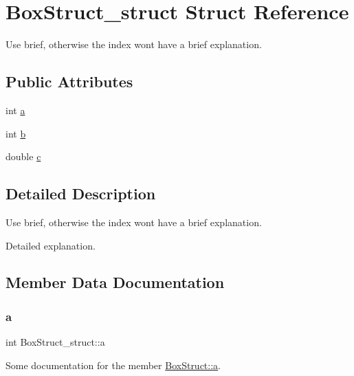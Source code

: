 \hypertarget{struct_box_struct__struct}{}\section{Box\+Struct\+\_\+struct Struct Reference}
\label{struct_box_struct__struct}


Use brief, otherwise the index won\textquotesingle{}t have a brief explanation.  


\subsection*{Public Attributes}
\begin{DoxyCompactItemize}
\item 
int \mbox{\hyperlink{struct_box_struct__struct_a4593938c5e90f024e7971bdb1392d9d6}{a}}
\item 
int \mbox{\hyperlink{struct_box_struct__struct_aee44748dc579c5d794853ee8b133d197}{b}}
\item 
double \mbox{\hyperlink{struct_box_struct__struct_a4543370ed67b2cf5ae3f55201bea11e6}{c}}
\end{DoxyCompactItemize}


\subsection{Detailed Description}
Use brief, otherwise the index won\textquotesingle{}t have a brief explanation. 

Detailed explanation. 

\subsection{Member Data Documentation}
\mbox{\label{struct_box_struct__struct_a4593938c5e90f024e7971bdb1392d9d6}} 
\subsubsection{\texorpdfstring{a}{a}}
{\footnotesize\ttfamily int Box\+Struct\+\_\+struct\+::a}

Some documentation for the member \mbox{\hyperlink{struct_box_struct__struct_a4593938c5e90f024e7971bdb1392d9d6}{Box\+Struct\+::a}}. \mbox{\label{struct_box_struct__struct_aee44748dc579c5d794853ee8b133d197}} 
